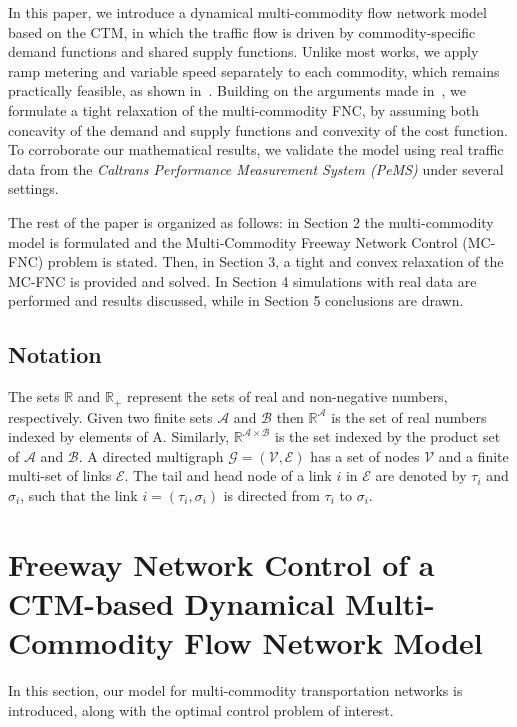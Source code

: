 \documentclass[preprint,12pt]{elsarticle}
\newcommand{\mc}{\mathcal}
\begin{document}
In this paper, we introduce a dynamical multi-commodity flow network model based on the CTM, in which the traffic flow is driven by commodity-specific demand functions and shared supply functions. Unlike most works, we apply ramp metering and variable speed separately to each commodity, which remains practically feasible, as shown in~\cite{Multi_comm}. Building on the arguments made in~\cite{ConvAndRob}, we formulate a tight relaxation of the multi-commodity FNC, by assuming both concavity of the demand and supply functions and convexity of the cost function. To corroborate our mathematical results, we validate the model using real traffic data from the \textit{Caltrans Performance Measurement System (PeMS)} under several settings.

The rest of the paper is organized as follows: in Section 2 the multi-commodity model is formulated and the Multi-Commodity Freeway Network Control (MC-FNC) problem is stated. Then, in Section 3, a tight and convex relaxation of the MC-FNC is provided and solved. In Section 4 simulations with real data are performed and results discussed, while in Section 5 conclusions are drawn.  

\subsection{Notation}
The sets $\mathbb{R}$ and $\mathbb{R}_+$ represent the sets of real and non-negative numbers, respectively. Given two finite sets $\mathcal{A}$ and $\mathcal{B}$ then $\mathbb{R}^\mathcal{A}$ is the set of real numbers indexed by elements of A. Similarly, $\mathbb{R}^{\mathcal{A} \times \mathcal{B}}$ is the set indexed by the product set of $\mathcal{A}$ and $\mathcal{B}$. A directed multigraph $\mathcal{G} = (\mathcal{V},\mathcal{E})$ has a set of nodes $\mathcal{V}$ and a finite multi-set of links $\mathcal{E}$. 
The tail and head node of a link $i$ in $\mc{E}$ are denoted by $\tau_i$ and $\sigma_i$, such that the link $i = \left( \tau_i,\sigma_i\right)$ is directed from $\tau_i$ to $\sigma_i$.


\section{Freeway Network Control of a CTM-based Dynamical Multi-Commodity Flow Network Model}

In this section, our model for multi-commodity transportation networks is introduced, along with the optimal control problem of interest. 
\end{document}
